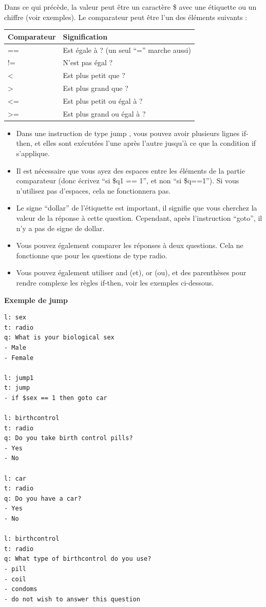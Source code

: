 \documentclass[
]{book}
\providecommand{\tightlist}{%
  \setlength{\itemsep}{0pt}\setlength{\parskip}{0pt}}
\begin{document}
Dans ce qui précède, la valeur peut être un caractère \$ avec une
étiquette ou un chiffre (voir exemples). Le comparateur peut être l'un
des éléments suivants :

\begin{longtable}[]{@{}ll@{}}
\toprule
Comparateur & Signification\tabularnewline
\midrule
\endhead
== & Est égale à ? (un seul ``='' marche aussi)\tabularnewline
!= & N'est pas égal ?\tabularnewline
\textless{} & Est plus petit que ?\tabularnewline
\textgreater{} & Est plus grand que ?\tabularnewline
\textless= & Est plus petit ou égal à ?\tabularnewline
\textgreater= & Est plus grand ou égal à ?\tabularnewline
\bottomrule
\end{longtable}

\begin{itemize}
\tightlist
\item
  Dans une instruction de type jump , vous pouvez avoir plusieurs lignes
  if-then, et elles sont exécutées l'une après l'autre jusqu'à ce que la
  condition if s'applique.
\item
  Il est nécessaire que vous ayez des espaces entre les éléments de la
  partie comparateur (donc écrivez ``si \$q1 == 1'', et non ``si
  \$q==1''). Si vous n'utilisez pas d'espaces, cela ne fonctionnera pas.
\item
  Le signe ``dollar'' de l'étiquette est important, il signifie que vous
  cherchez la valeur de la réponse à cette question. Cependant, après
  l'instruction ``goto'', il n'y a pas de signe de dollar.
\item
  Vous pouvez également comparer les réponses à deux questions. Cela ne
  fonctionne que pour les questions de type radio.
\item
  Vous pouvez également utiliser and (et), or (ou), et des parenthèses
  pour rendre complexe les règles if-then, voir les exemples ci-dessous.
\end{itemize}

\textbf{Exemple de jump}

\begin{verbatim}
l: sex
t: radio
q: What is your biological sex
- Male
- Female

l: jump1
t: jump
- if $sex == 1 then goto car

l: birthcontrol
t: radio
q: Do you take birth control pills?
- Yes
- No

l: car
t: radio
q: Do you have a car?
- Yes
- No

l: birthcontrol
t: radio
q: What type of birthcontrol do you use?
- pill
- coil
- condoms
- do not wish to answer this question
\end{verbatim}
\end{document}
